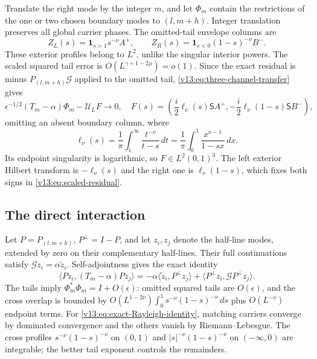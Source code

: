 Translate the right mode by the integer $m$, and let $\Phi_m$ contain
the restrictions of the one or two chosen boundary modes to
$(l,m+h)$.  Integer translation preserves all global carrier phases.
The omitted-tail envelope columns are
\[
 Z_L(s)=\mathbf1_{s>1}s^{-\nu}A^+,\qquad
 Z_R(s)=\mathbf1_{s<0}(1-s)^{-\nu}B^-.
\]
These exterior profiles belong to $L^2$, unlike the singular interior
powers. The scaled squared tail error is
$O(L^{\gamma+1-2\mu})=o(1)$. Since the exact residual is minus
$P_{(l,m+h)}\mathcal G$ applied to the omitted tail,
\eqref{v13:eq:three-channel-transfer} gives
\begin{equation}\label{v13:eq:scaled-residual}
 \epsilon^{-1/2}(T_m-\alpha)\Phi_m-\mathcal U_LF\longrightarrow0,
 \quad
 F(s)=\left(\frac i2\ell_\nu(s)\mathsf SA^+,
          -\frac i2\ell_\nu(1-s)\mathsf SB^-\right),
\end{equation}
omitting an absent boundary column, where
\[
 \ell_\nu(s)=\frac1\pi\int_1^\infty\frac{t^{-\nu}}{t-s}\,dt
            =\frac1\pi\int_0^1\frac{x^{\nu-1}}{1-sx}\,dx.
\]
Its endpoint singularity is logarithmic, so $F\in L^2(0,1)^3$.
The left exterior Hilbert transform is $-\ell_\nu(s)$ and the
right one is $\ell_\nu(1-s)$, which fixes both signs in
\eqref{v13:eq:scaled-residual}.

\subsection{The direct interaction}

Let $P=P_{(l,m+h)}$, $P^\perp=I-P$, and let $z_i,z_j$ denote
the half-line modes, extended by zero on their complementary half-lines.
Their full continuations satisfy $\mathcal Gz_i=\alpha\widetilde z_i$.
Self-adjointness gives the exact identity
\begin{equation}\label{v13:eq:exact-Rayleigh-identity}
 \langle Pz_i,(T_m-\alpha)Pz_j\rangle
  =-\alpha\langle\widetilde z_i,P^\perp z_j\rangle
        +\langle P^\perp z_i,\mathcal GP^\perp z_j\rangle.
\end{equation}
The tails imply $\Phi_m^*\Phi_m=I+O(\epsilon)$: omitted squared
tails are $O(\epsilon)$, and the cross overlap is bounded by
$O(L^{1-2\nu})\int_0^1s^{-\nu}(1-s)^{-\nu}\,ds$ plus
$O(L^{-\nu})$ endpoint terms.  For \eqref{v13:eq:exact-Rayleigh-identity}, matching carriers converge
by dominated convergence and the others vanish by Riemann--Lebesgue.
The cross profiles $s^{-\nu}(1-s)^{-\nu}$ on $(0,1)$ and
$|s|^{-\nu}(1-s)^{-\nu}$ on $(-\infty,0)$ are integrable;
the better tail exponent controls the remainders.

